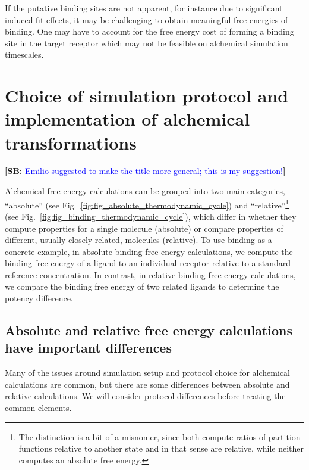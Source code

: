 \documentclass[9pt,bestpractices]{livecoms}
\newcommand{\sbnote}[1]{%
  {\bfseries{}[SB: }%
  {\textcolor{blue}{#1}}{\bfseries{}]}
}
\begin{document}
If the putative binding sites are not apparent, for instance due to significant induced-fit effects, it may be challenging to obtain meaningful free energies of binding. One may have to account for the free energy cost of forming a binding site in the target receptor which may not be feasible on alchemical simulation timescales.

\section{Choice of simulation protocol and implementation of alchemical transformations}
  \sbnote{Emilio suggested to make the title more general; this is my suggestion!}
\label{sec:simulation_protocol_choice}
Alchemical free energy calculations can be grouped into two main categories, ``absolute'' (see Fig.~\ref{fig:fig_absolute_thermodynamic_cycle}) and ``relative''\footnote{The distinction is a bit of a misnomer, since both compute ratios of partition functions relative to another state and in that sense are relative, while neither computes an absolute free energy.} (see Fig.~\ref{fig:fig_binding_thermodynamic_cycle}), which differ in whether they compute properties for a single molecule (absolute) or compare properties of different, usually closely related, molecules (relative).
To use binding as a concrete example, in absolute binding free energy calculations, we compute the binding free energy of a ligand to an individual receptor relative to a standard reference concentration. In contrast, in relative binding free energy calculations, we compare the binding free energy of two related ligands to determine the potency difference.

\subsection{Absolute and relative free energy calculations have important differences}
Many of the issues around simulation setup and protocol choice for alchemical calculations are common, but there are some differences between absolute and relative calculations. We will consider protocol differences before treating the common elements.
\end{document}
